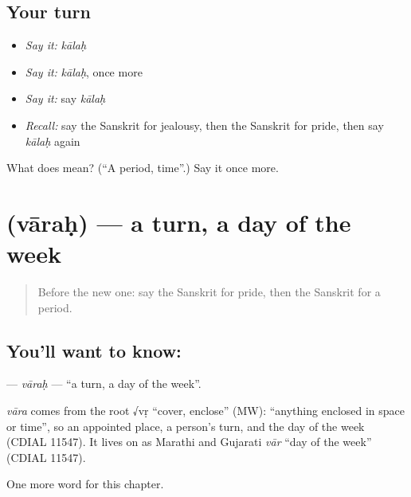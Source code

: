 \subsection*{Your turn}
\begin{itemize}
\raggedright
  \item \emph{Say it:} \emph{kālaḥ}
  \item \emph{Say it:} \emph{kālaḥ}, once more
  \item \emph{Say it:} say \emph{kālaḥ}
  \item \emph{Recall:} say the Sanskrit for jealousy, then the Sanskrit for pride, then say \emph{kālaḥ} again
\end{itemize}

\begin{tcolorbox}[breakable,colback=teal!4,colframe=teal!35!black,title={Before you move on}]
What does  mean? (\textquotedblleft{}A period, time\textquotedblright{}.) Say it once more.
\end{tcolorbox}
\section[\texorpdfstring{\sk{वारः} (vāraḥ)}{वारः (vāraḥ)}]{ (vāraḥ) — a turn, a day of the week}

\label{lesson:SA-C152-varah}



\begin{quote}
Before the new one: say the Sanskrit for pride, then the Sanskrit for a period.
\end{quote}

\subsection*{You'll want to know: }
\textbf{} — \emph{vāraḥ} — \textquotedblleft{}a turn, a day of the week\textquotedblright{}.

\begin{cousinweb}
\emph{vāra} comes from the root √vṛ \textquotedblleft{}cover, enclose\textquotedblright{} (MW): \textquotedblleft{}anything enclosed in space or time\textquotedblright{}, so an appointed place, a person's turn, and the day of the week (CDIAL 11547). It lives on as Marathi and Gujarati \emph{vār} \textquotedblleft{}day of the week\textquotedblright{} (CDIAL 11547).
\end{cousinweb}

\begin{grammarlens}[title={What you've built}]
One more word for this chapter.
\end{grammarlens}


